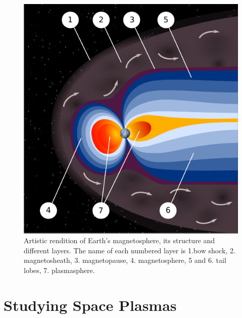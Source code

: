         \begin{figure}
            \begin{center}
                \includegraphics[width=1\textwidth]{figures/chap1/Magnetosphere_Levels.pdf}
                \caption[Earth's Magnetosphere's structure]{Artistic rendition of Earth's magnetosphere, its structure and different layers. The name of each numbered layer is 1.bow shock, 2. magnetosheath, 3. magnetopause, 4. magnetosphere, 5 and 6. tail lobes, 7. plasmasphere.\protect\footnotemark}
                \label{fig:ms_earth}
            \end{center}
        \end{figure}

    \section{Studying Space Plasmas} \label{sec:plas3}


